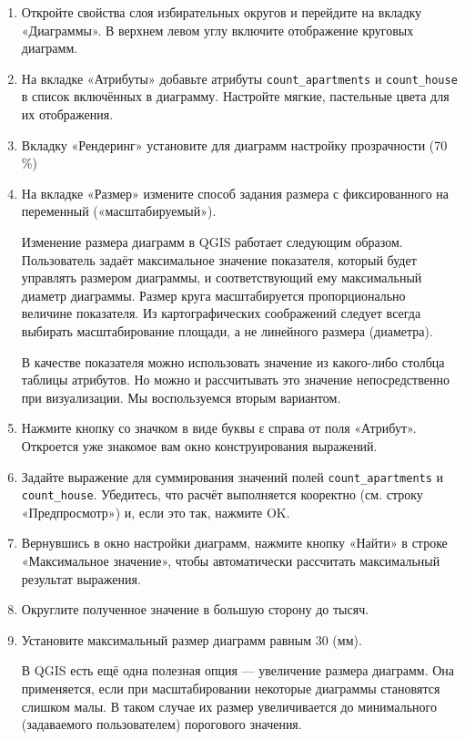 \documentclass[
  12pt,
]{book}
\begin{document}
\begin{enumerate}
\def\labelenumi{\arabic{enumi}.}
\item
  Откройте свойства слоя избирательных округов и перейдите на вкладку «Диаграммы». В верхнем левом углу включите отображение круговых диаграмм.
\item
  На вкладке «Атрибуты» добавьте атрибуты \texttt{count\_apartments} и \texttt{count\_house} в список включённых в диаграмму. Настройте мягкие, пастельные цвета для их отображения.
\item
  Вкладку «Рендеринг» установите для диаграмм настройку прозрачности (70 \%)
\item
  На вкладке «Размер» измените способ задания размера с фиксированного на переменный («масштабируемый»).

  Изменение размера диаграмм в QGIS работает следующим образом. Пользователь задаёт максимальное значение показателя, который будет управлять размером диаграммы, и соответствующий ему максимальный диаметр диаграммы. Размер круга масштабируется пропорционально величине показателя. Из картографических соображений следует всегда выбирать масштабирование площади, а не линейного размера (диаметра).

  В качестве показателя можно использовать значение из какого-либо столбца таблицы атрибутов. Но можно и рассчитывать это значение непосредственно при визуализации. Мы воспользуемся вторым вариантом.
\item
  Нажмите кнопку со значком в виде буквы ε справа от поля «Атрибут». Откроется уже знакомое вам окно конструирования выражений.
\item
  Задайте выражение для суммирования значений полей \texttt{count\_apartments} и \texttt{count\_house}. Убедитесь, что расчёт выполняется кооректно (см. строку «Предпросмотр») и, если это так, нажмите OK.
\item
  Вернувшись в окно настройки диаграмм, нажмите кнопку «Найти» в строке «Максимальное значение», чтобы автоматически рассчитать максимальный результат выражения.
\item
  Округлите полученное значение в большую сторону до тысяч.
\item
  Установите максимальный размер диаграмм равным 30 (мм).

  В QGIS есть ещё одна полезная опция --- увеличение размера диаграмм. Она применяется, если при масштабировании некоторые диаграммы становятся слишком малы. В таком случае их размер увеличивается до минимального (задаваемого пользователем) порогового значения.


\end{enumerate}
\end{document}
